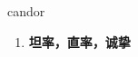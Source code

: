 
\begin{frame}
{\huge candor}
\begin{center}
\begin{enumerate}\Large
  \item \textbf{坦率，直率，诚挚}
\end{enumerate}
\end{center}
\end{frame}
